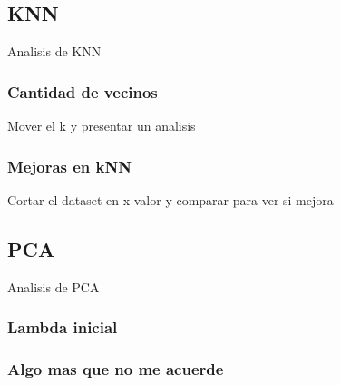 \subsection{KNN}
Analisis de KNN

\subsubsection{Cantidad de vecinos}
Mover el k y presentar un analisis

\subsubsection{Mejoras en kNN}
Cortar el dataset en x valor y comparar para ver si mejora

\subsection{PCA}
Analisis de PCA

\subsubsection{Lambda inicial}

\subsubsection{Algo mas que no me acuerde}
